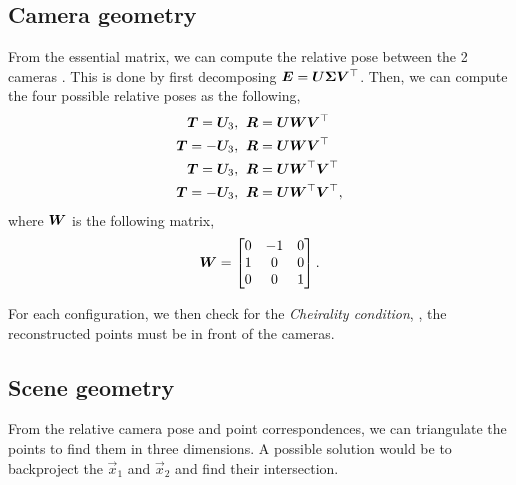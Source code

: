 \subsection{Camera geometry}

From the essential matrix, we can compute the relative pose between the 2 cameras
\citep{longuet1981computer}. This is done by first decomposing $\bm{E} =
    \bm{U} \bm{\Sigma} \bm{V}^\top$. Then, we
can compute the four possible relative poses as the following,
\begin{align*}
    \bm{T} = \bm{U}_3,  & \hspace{0.2cm} \bm{R} = \bm{U}\bm{W}\bm{V}^\top              \\
    \bm{T} = -\bm{U}_3, & \hspace{0.2cm} \bm{R} = \bm{U}\bm{W}\bm{V}^\top              \\
    \bm{T} = \bm{U}_3,  & \hspace{0.2cm} \bm{R} = \bm{U}\bm{W}^\top\bm{V}^\top  \\
    \bm{T} = -\bm{U}_3, & \hspace{0.2cm} \bm{R} = \bm{U}\bm{W}^\top\bm{V}^\top,
\end{align*}
where $\bm{W}$ is the following matrix, \[
    \bm{W} = \begin{bmatrix}
        0 & -1 & 0 \\
        1 & 0  & 0 \\
        0 & 0  & 1
    \end{bmatrix}.
\]

For each configuration, we then check for the \textit{Cheirality condition},
\ie, the reconstructed points must be in front of the cameras.

\subsection{Scene geometry}

From the relative camera pose and point correspondences, we can triangulate the
points to find them in three dimensions. A possible solution would be to
backproject the $\vec{x}_1$ and $\vec{x}_2$ and find their intersection.

